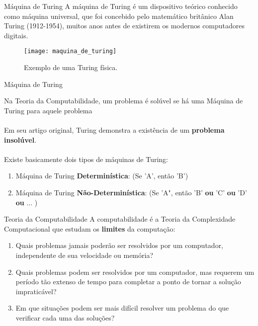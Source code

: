 \documentclass{beamer}
\begin{document}
\begin{frame}{Máquina de Turing}
	\justify A máquina de Turing é um dispositivo teórico conhecido como máquina universal, que foi concebido pelo matemático britânico Alan Turing (1912-1954), muitos anos antes de existirem os modernos computadores digitais. \\	
	
	\begin{figure}
		\centering
		\texttt{[image: maquina\_de\_turing]}
		\caption{Exemplo de uma Turing física.}
	\end{figure}
\end{frame}

\begin{frame}{Máquina de Turing}
	
	Na Teoria da Computabilidade, um problema é solúvel se há uma Máquina de Turing para aquele problema\\~\\
	
	Em seu artigo original, Turing demonstra a existência de um \textbf{problema insolúvel}.\\~\\	
	
	
	Existe basicamente dois tipos de máquinas de Turing:
	\begin{enumerate}
		\item Máquina de Turing \textbf{Determinística}: (Se 'A', então 'B')
		\item Máquina de Turing \textbf{Não-Determinística}: (Se 'A", então 'B' \textbf{ou} 'C' \textbf{ou} 'D' \textbf{ou} $\ldots$ )
	\end{enumerate}
\end{frame}

\begin{frame}{Teoria da Computabilidade}
	A computabilidade é a Teoria da Complexidade Computacional que estudam os \textbf{limites} da computação:
	
	\begin{enumerate}
		\item Quais problemas jamais poderão ser resolvidos por um computador, independente de sua velocidade ou memória?
		\item Quais problemas podem ser resolvidos por um computador, mas requerem um período tão extenso de tempo para completar a ponto de tornar a solução impraticável?
		\item Em que situações podem ser mais difícil resolver um problema do que verificar cada uma das soluções? 
	\end{enumerate}	
\end{frame}
\end{document}
